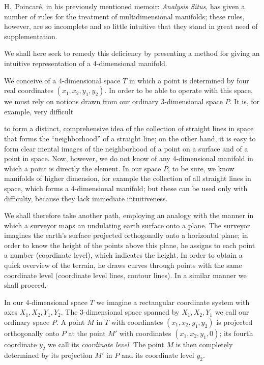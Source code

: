 \documentclass{article}
\begin{document}
H.~Poincaré, in his previously mentioned memoir: \emph{Analysis Situs}, has given a number of rules for the treatment of multidimensional manifolds; these rules, however, are so incomplete and so little intuitive that they stand in great need of supplementation.

We shall here seek to remedy this deficiency by presenting a method for giving an intuitive representation of a 4-dimensional manifold.

We conceive of a 4-dimensional space $T$ in which a point is determined by four real coordinates $(x_1, x_2, y_1, y_2)$. In order to be able to operate with this space, we must rely on notions drawn from our ordinary 3-dimensional space $P$. It is, for example, very difficult

to form a distinct, comprehensive idea of the collection of straight lines in space that forms the “neighborhood” of a straight line; on the other hand, it is easy to form clear mental images of the neighborhood of a point on a surface and of a point in space. Now, however, we do not know of any 4-dimensional manifold in which a point is directly the element. In our space $P$, to be sure, we know manifolds of higher dimension, for example the collection of all straight lines in space, which forms a 4-dimensional manifold; but these can be used only with difficulty, because they lack immediate intuitiveness.

We shall therefore take another path, employing an analogy with the manner in which a surveyor maps an undulating earth surface onto a plane. The surveyor imagines the earth's surface projected orthogonally onto a horizontal plane; in order to know the height of the points above this plane, he assigns to each point a number (coordinate level), which indicates the height. In order to obtain a quick overview of the terrain, he draws curves through points with the same coordinate level (coordinate level lines, contour lines). In a similar manner we shall proceed.

In our 4-dimensional space $T$ we imagine a rectangular coordinate system with axes $X_1, X_2, Y_1, Y_2$. The 3-dimensional space spanned by $X_1, X_2, Y_1$ we call our ordinary space $P$. A point $M$ in $T$ with coordinates $(x_1, x_2, y_1, y_2)$ is projected orthogonally onto $P$ at the point $M'$ with coordinates $(x_1, x_2, y_1, 0)$; its fourth coordinate $y_2$ we call its \emph{coordinate level}. The point $M$ is then completely determined by its projection $M'$ in $P$ and its coordinate level $y_2$.
\end{document}
